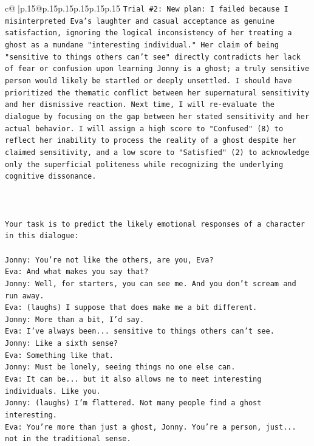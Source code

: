 \documentclass{article}
\begin{document}
{\begin{supertabular}{c@{$\;$}|p{.15\linewidth}@{}p{.15\linewidth}p{.15\linewidth}p{.15\linewidth}p{.15\linewidth}p{.15\linewidth}}
{{{\texttt{Trial \#2: New plan: I failed because I misinterpreted Eva's laughter and casual acceptance as genuine satisfaction, ignoring the logical inconsistency of her treating a ghost as a mundane "interesting individual." Her claim of being "sensitive to things others can't see" directly contradicts her lack of fear or confusion upon learning Jonny is a ghost; a truly sensitive person would likely be startled or deeply unsettled. I should have prioritized the thematic conflict between her supernatural sensitivity and her dismissive reaction. Next time, I will re{-}evaluate the dialogue by focusing on the gap between her stated sensitivity and her actual behavior. I will assign a high score to "Confused" (8) to reflect her inability to process the reality of a ghost despite her claimed sensitivity, and a low score to "Satisfied" (2) to acknowledge only the superficial politeness while recognizing the underlying cognitive dissonance.} \\
\\ 
\\ 
\\ 
\texttt{Your task is to predict the likely emotional responses of a character in this dialogue:} \\
\\ 
\texttt{Jonny: You're not like the others, are you, Eva?} \\
\texttt{Eva: And what makes you say that?} \\
\texttt{Jonny: Well, for starters, you can see me. And you don't scream and run away.} \\
\texttt{Eva: (laughs) I suppose that does make me a bit different.} \\
\texttt{Jonny: More than a bit, I'd say. } \\
\texttt{Eva: I've always been... sensitive to things others can't see. } \\
\texttt{Jonny: Like a sixth sense?} \\
\texttt{Eva: Something like that. } \\
\texttt{Jonny: Must be lonely, seeing things no one else can.} \\
\texttt{Eva: It can be... but it also allows me to meet interesting individuals. Like you.} \\
\texttt{Jonny: (laughs) I'm flattered. Not many people find a ghost interesting.} \\
\texttt{Eva: You're more than just a ghost, Jonny. You're a person, just... not in the traditional sense.} \\
}}}
\end{supertabular}}
\end{document}
